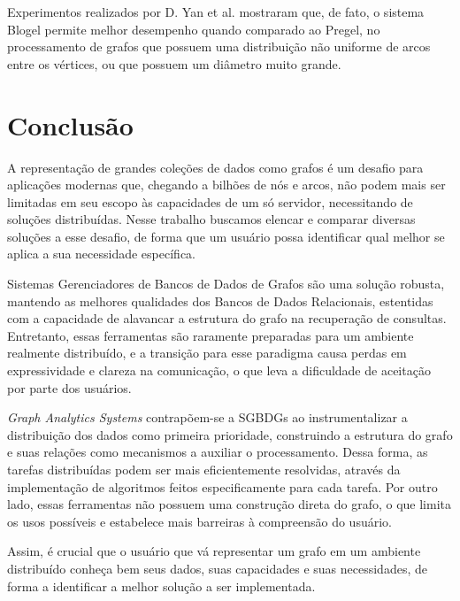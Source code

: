 \documentclass[conference]{IEEEtran}
\begin{document}
Experimentos realizados por D. Yan et al. mostraram que, de fato, o
sistema Blogel permite melhor desempenho quando comparado ao Pregel, no
processamento de grafos que possuem uma distribuição não uniforme de
arcos entre os vértices, ou que possuem um diâmetro muito grande.

\section{Conclusão}

A representação de grandes coleções de dados como grafos é um desafio para aplicações modernas que, chegando a bilhões de nós e arcos, não podem mais ser limitadas em seu escopo às capacidades de um só servidor, necessitando de soluções distribuídas. Nesse trabalho buscamos elencar e comparar diversas soluções a esse desafio, de forma que um usuário possa identificar qual melhor se aplica a sua necessidade específica.

Sistemas Gerenciadores de Bancos de Dados de Grafos são uma solução robusta, mantendo as melhores qualidades dos Bancos de Dados Relacionais, estentidas com a capacidade de alavancar a estrutura do grafo na recuperação de consultas. Entretanto, essas ferramentas são raramente preparadas para um ambiente realmente distribuído, e a transição para esse paradigma causa perdas em expressividade e clareza na comunicação, o que leva a dificuldade de aceitação por parte dos usuários.

\emph{Graph Analytics Systems} contrapõem-se a SGBDGs ao instrumentalizar a distribuição dos dados como primeira prioridade, construindo a estrutura do grafo e suas relações como mecanismos a auxiliar o processamento. Dessa forma, as tarefas distribuídas podem ser mais eficientemente resolvidas, através da implementação de algoritmos feitos especificamente para cada tarefa. Por outro lado, essas ferramentas não possuem uma construção direta do grafo, o que limita os usos possíveis e estabelece mais barreiras à compreensão do usuário.

Assim, é crucial que o usuário que vá representar um grafo em um ambiente distribuído conheça bem seus dados, suas capacidades e suas necessidades, de forma a identificar a melhor solução a ser implementada.
\end{document}
